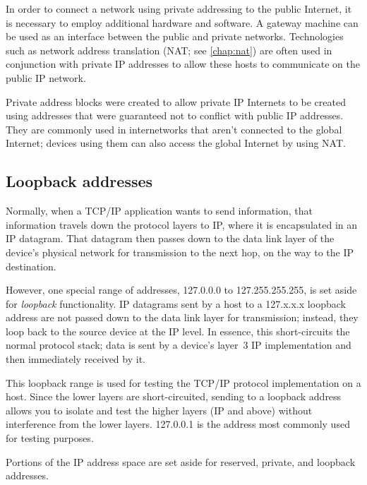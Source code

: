 \begin{note}
In order to connect a network using private addressing to the public Internet, it is necessary to employ additional hardware and software.
A gateway machine can be used as an interface between the public and private networks.
Technologies such as network address translation (NAT; see \vref{chap:nat}) are often used in conjunction with private IP addresses to allow these hosts
to communicate on the public IP network.
\end{note}


\begin{keyconcept}
Private address blocks were created to allow private IP Internets to be created using addresses that were guaranteed not to conflict with public IP addresses.
They are commonly used in internetworks that aren't connected to the global Internet; devices using them can also access the global Internet by using NAT.
\end{keyconcept}


\subsection{Loopback addresses}

Normally, when a TCP/IP application wants to send information, that
information travels down the protocol layers to IP, where it is
encapsulated in an IP datagram. That datagram then passes down to the
data link layer of the device's physical network for transmission to the
next hop, on the way to the IP
destination.

However, one special range of addresses, 127.0.0.0 to 127.255.255.255,
is set aside for {\emph{loopback}} functionality. IP datagrams sent by a
host to a 127.x.x.x loopback address are not passed down to the data
link layer for transmission; instead, they loop back to the source
device at the IP level. In essence, this short-circuits the normal
protocol stack; data is sent by a device's layer~3 IP implementation and
then immediately received by it.

This loopback range is used for testing the TCP/IP protocol
implementation on a host. Since the lower layers are short-circuited,
sending to a loopback address allows you to isolate and test the higher
layers (IP and above) without interference from the lower layers.
127.0.0.1 is the address most commonly used for testing purposes.


\begin{keyconcept}
Portions of the IP address space are set aside for reserved, private, and loopback addresses.
\end{keyconcept}



